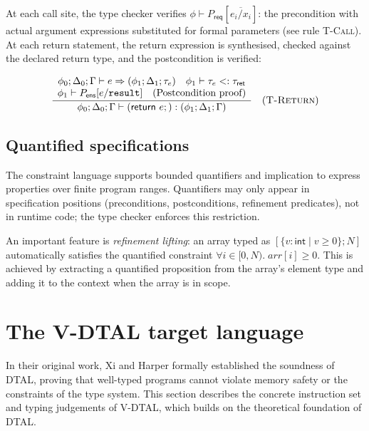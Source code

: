 At each call site, the type checker verifies $\phi \vdash P_\textsf{req}[\overline{e_i/x_i}]$: the precondition with actual argument expressions substituted for formal parameters (see rule \textsc{T-Call}). At each \textsf{return} statement, the return expression is synthesised, checked against the declared return type, and the postcondition is verified:

$$
  \frac{
    \begin{array}{c}
      \phi_0; \Delta_0; \Gamma \vdash e \Rightarrow (\phi_1; \Delta_1; \tau_e) \quad \phi_1 \vdash \tau_e <: \tau_\textsf{ret} \\
      \phi_1 \vdash P_\textsf{ens}[e/\mathtt{result}] \quad \text{(Postcondition proof)}
    \end{array}
  }{
    \phi_0; \Delta_0; \Gamma \vdash (\textsf{return } e;) : (\phi_1; \Delta_1; \Gamma)
  } \quad (\textsc{T-Return})
$$

\subsection{Quantified specifications}

The constraint language supports bounded quantifiers and implication to express properties over finite program ranges. Quantifiers may only appear in specification positions (preconditions, postconditions, refinement predicates), not in runtime code; the type checker enforces this restriction.

An important feature is \textit{refinement lifting}: an array typed as $[\{v\!:\!\textsf{int} \mid v \ge 0\}; N]$ automatically satisfies the quantified constraint $\forall i \in [0, N).\; \mathit{arr}[i] \ge 0$. This is achieved by extracting a quantified proposition from the array's element type and adding it to the context when the array is in scope.

\section{The V-DTAL target language}\label{sec:dtal-target-lang}

In their original work, Xi and Harper formally established the soundness of DTAL, proving that well-typed programs cannot violate memory safety or the constraints of the type system.
This section describes the concrete instruction set and typing judgements of V-DTAL, which builds on the theoretical foundation of DTAL.

